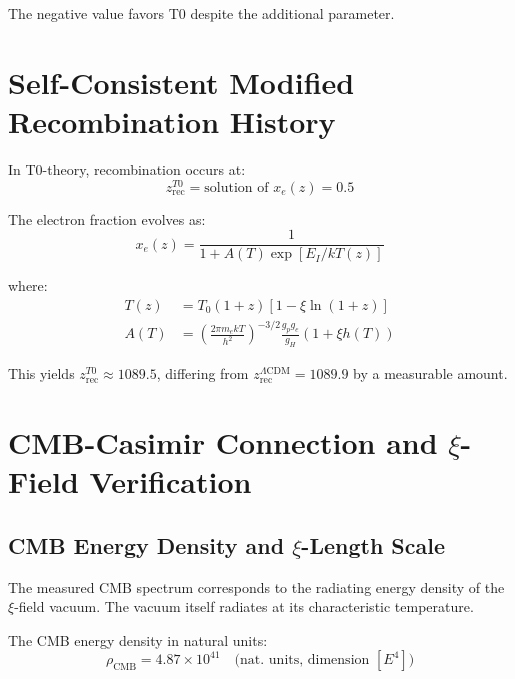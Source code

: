 \documentclass[12pt,a4paper]{report}
\begin{document}
	The negative value favors T0 despite the additional parameter.
	
	\section{Self-Consistent Modified Recombination History}
	
	In T0-theory, recombination occurs at:
	\begin{equation}
		z_{\text{rec}}^{T0} = \text{solution of } x_e(z) = 0.5
	\end{equation}
	
	The electron fraction evolves as:
	\begin{equation}
		x_e(z) = \frac{1}{1 + A(T) \exp[E_I/kT(z)]}
	\end{equation}
	
	where:
	\begin{align}
		T(z) &= T_0(1+z)[1 - \xi\ln(1+z)] \\
		A(T) &= \left(\frac{2\pi m_e kT}{h^2}\right)^{-3/2} 
		\frac{g_p g_e}{g_H} (1 + \xi h(T))
	\end{align}
	
	This yields $z_{\text{rec}}^{T0} \approx 1089.5$, differing from 
	$z_{\text{rec}}^{\Lambda\text{CDM}} = 1089.9$ by a measurable amount.
	
	
	\section{CMB-Casimir Connection and $\xi$-Field Verification}
	\label{sec:cmb_casimir}
	
	\subsection{CMB Energy Density and $\xi$-Length Scale}
	
	\begin{revolutionary}
		The measured CMB spectrum corresponds to the radiating energy density of the $\xi$-field vacuum. The vacuum itself radiates at its characteristic temperature.
	\end{revolutionary}
	
	The CMB energy density in natural units:
	\begin{equation}
		\rho_{\text{CMB}} = 4.87 \times 10^{41} \quad \text{(nat. units, dimension } [E^4] \text{)}
	\end{equation}
	
\end{document}
